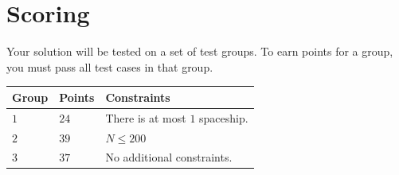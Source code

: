 \section*{Scoring}
Your solution will be tested on a set of test groups.
To earn points for a group, you must pass all test cases in that group.

\noindent
\begin{tabular}{| l | l | l |}
\hline
\textbf{Group} & \textbf{Points} & \textbf{Constraints} \\ \hline
$1$   & $24$       & There is at most $1$ spaceship. \\ \hline
$2$   & $39$       & $N \leq 200$ \\ \hline
$3$   & $37$       & No additional constraints. \\ \hline
\end{tabular}
